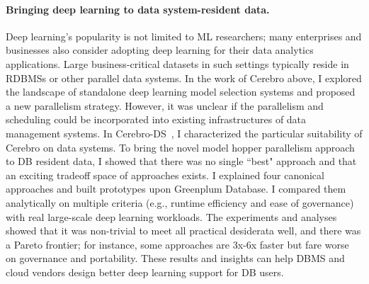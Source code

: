 \documentclass[letterpaper]{article}
\begin{document}
\paragraph{Bringing deep learning to data system-resident data.}
Deep learning's popularity is not limited to ML researchers; many enterprises and businesses also consider adopting deep learning for their data analytics applications. Large business-critical
datasets in such settings typically reside in RDBMSs or other parallel data
systems.  In the work of Cerebro above, I explored the landscape of standalone deep learning model selection systems and proposed a new parallelism strategy. However, it was unclear if the parallelism and scheduling could be incorporated into existing infrastructures of data management systems. In Cerebro-DS~\cite{cerebro-ds}, I characterized the particular suitability of Cerebro on data systems. To bring the novel model hopper parallelism approach to DB resident data, I showed that there was no single ``best" approach and
that an exciting tradeoff space of approaches exists. I explained four
canonical approaches and built prototypes upon Greenplum Database. I compared them analytically on multiple criteria (e.g., runtime
efficiency and ease of governance) with real large-scale deep learning workloads. The experiments and analyses showed
that it was non-trivial to meet all practical desiderata well, and there was
a Pareto frontier; for instance, some approaches are 3x-6x faster but
fare worse on governance and portability. These results and insights
can help DBMS and cloud vendors design better deep learning support for DB
users.
\end{document}
